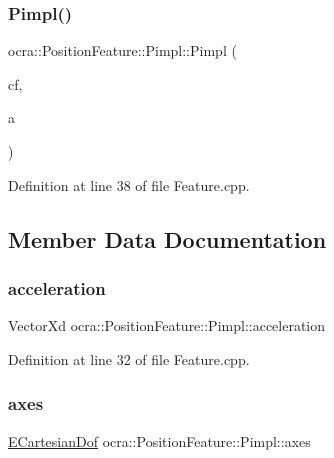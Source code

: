 \subsubsection{\texorpdfstring{Pimpl()}{Pimpl()}}
{\footnotesize\ttfamily ocra\+::\+Position\+Feature\+::\+Pimpl\+::\+Pimpl (\begin{DoxyParamCaption}\item[{Control\+Frame\+::\+Ptr}]{cf,  }\item[{\hyperlink{namespaceocra_a436781c7059a0f76027df1c652126260}{E\+Cartesian\+Dof}}]{a }\end{DoxyParamCaption})\hspace{0.3cm}{\ttfamily [inline]}}



Definition at line 38 of file Feature.\+cpp.



\subsection{Member Data Documentation}
\hypertarget{structocra_1_1PositionFeature_1_1Pimpl_a2a251a27da0e093461ba88a7dcb5ce1d}{}\label{structocra_1_1PositionFeature_1_1Pimpl_a2a251a27da0e093461ba88a7dcb5ce1d} 
\subsubsection{\texorpdfstring{acceleration}{acceleration}}
{\footnotesize\ttfamily Vector\+Xd ocra\+::\+Position\+Feature\+::\+Pimpl\+::acceleration}



Definition at line 32 of file Feature.\+cpp.

\hypertarget{structocra_1_1PositionFeature_1_1Pimpl_a671e502b35c4d7ec8c8f972933ebac1e}{}\label{structocra_1_1PositionFeature_1_1Pimpl_a671e502b35c4d7ec8c8f972933ebac1e} 
\subsubsection{\texorpdfstring{axes}{axes}}
{\footnotesize\ttfamily \hyperlink{namespaceocra_a436781c7059a0f76027df1c652126260}{E\+Cartesian\+Dof} ocra\+::\+Position\+Feature\+::\+Pimpl\+::axes}



